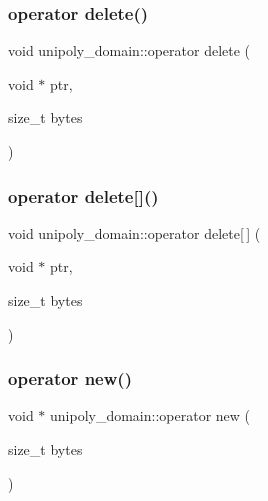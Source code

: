 \mbox{\label{classunipoly__domain_a77df7f8c647d78cc7914d4a54cee42a3}} 
\subsubsection{\texorpdfstring{operator delete()}{operator delete()}}
{\footnotesize\ttfamily void unipoly\+\_\+domain\+::operator delete (\begin{DoxyParamCaption}\item[{void $\ast$}]{ptr,  }\item[{size\+\_\+t}]{bytes }\end{DoxyParamCaption})}

\mbox{\label{classunipoly__domain_a4850c668b764fa9ad3f9f665709ea0ca}} 
\subsubsection{\texorpdfstring{operator delete[]()}{operator delete[]()}}
{\footnotesize\ttfamily void unipoly\+\_\+domain\+::operator delete\mbox{[}$\,$\mbox{]} (\begin{DoxyParamCaption}\item[{void $\ast$}]{ptr,  }\item[{size\+\_\+t}]{bytes }\end{DoxyParamCaption})}

\mbox{\label{classunipoly__domain_ac14a6bbdd4f6f5ad85b263c608b1299e}} 
\subsubsection{\texorpdfstring{operator new()}{operator new()}}
{\footnotesize\ttfamily void $\ast$ unipoly\+\_\+domain\+::operator new (\begin{DoxyParamCaption}\item[{size\+\_\+t}]{bytes }\end{DoxyParamCaption})}

